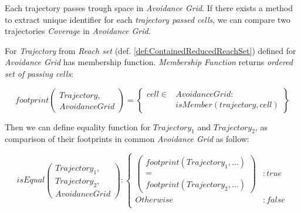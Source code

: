 Each trajectory passes trough space in \emph{Avoidance Grid}. If there exists a method to extract unique identifier for each \emph{trajectory passed cells}, we can compare two trajectories \emph{Coverage} in \emph{Avoidance Grid}.


\begin{definition} \label{def:trajectoryFootprint}
    For \emph{Trajectory} from \emph{Reach set} (def. \ref{def:ContainedReducedReachSet}) defined for \emph{Avoidance Grid} has membership function. \emph{Membership Function} returns \emph{ordered set of passing cells}:
    
    \begin{equation}\label{eq:setOfPassedCells}
        footprint
        \left(\begin{gathered}
            Trajectory,\\
            AvoidanceGrid    
        \end{gathered}\right) 
        = 
        \left\{
            \begin{aligned}
                cell \in& AvoidanceGrid:\\ &isMember(trajectory,cell)
            \end{aligned}
        \right\}
    \end{equation}
    
    \noindent Then we can define equality function for $Trajectory_1$ and $Trajectory_2$, as comparison of their footprints in common \emph{Avoidance Grid} as follow:
    
    \begin{equation}\label{eq:TrajectoryEquality}
        isEqual\left(\begin{gathered}
        Trajectory_1,\\Trajectory_2,\\AvoidanceGrid  
        \end{gathered}\right):
        \begin{cases}
            \left(\begin{gathered}
                footprint(Trajectory_1,\dots)\\
                = \\
                footprint(Trajectory_2,\dots)
            \end{gathered}\right)
            &:true\\
            Otherwise&: false\\
        \end{cases}
    \end{equation}
\end{definition}

